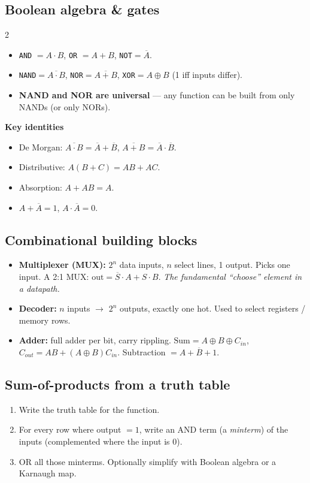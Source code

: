 \documentclass[10pt]{article}
\newcommand{\code}[1]{\texttt{\small #1}}
\begin{document}
\subsection{Boolean algebra \& gates}
\begin{multicols}{2}
\begin{itemize}
\item \code{AND} $=A\cdot B$, \code{OR} $=A+B$, \code{NOT}$=\overline{A}$.
\item \code{NAND}$=\overline{A\cdot B}$, \code{NOR}$=\overline{A+B}$, \code{XOR}$=A\oplus B$ (1 iff inputs differ).
\item \textbf{NAND and NOR are universal} --- any function can be built from only NANDs (or only NORs).
\end{itemize}
\columnbreak
\textbf{Key identities}
\begin{itemize}
\item De Morgan: $\overline{A\cdot B}=\overline{A}+\overline{B}$, \;$\overline{A+B}=\overline{A}\cdot\overline{B}$.
\item Distributive: $A(B+C)=AB+AC$.
\item Absorption: $A+AB=A$.
\item $A+\overline{A}=1$,\; $A\cdot\overline{A}=0$.
\end{itemize}
\end{multicols}

\subsection{Combinational building blocks}
\begin{itemize}
\item \textbf{Multiplexer (MUX):} $2^n$ data inputs, $n$ select lines, 1 output. Picks one input.
A 2:1 MUX: $\text{out}=\overline{S}\cdot A + S\cdot B$. \emph{The fundamental ``choose'' element in a datapath.}
\item \textbf{Decoder:} $n$ inputs $\to$ $2^n$ outputs, exactly one hot. Used to select registers / memory rows.
\item \textbf{Adder:} full adder per bit, carry rippling. $\text{Sum}=A\oplus B\oplus C_{in}$,
$C_{out}=AB+(A\oplus B)C_{in}$. Subtraction $=A + \overline{B} + 1$.
\end{itemize}

\subsection{Sum-of-products from a truth table}
\begin{enumerate}
\item Write the truth table for the function.
\item For every row where output $=1$, write an AND term (a \emph{minterm}) of the inputs
(complemented where the input is 0).
\item OR all those minterms. Optionally simplify with Boolean algebra or a Karnaugh map.
\end{enumerate}
\end{document}
